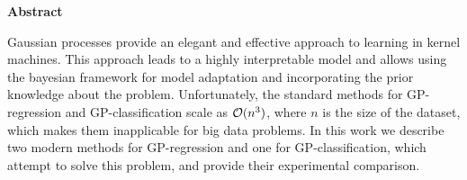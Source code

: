 \centerline{\bf Abstract}

Gaussian processes provide an elegant and effective approach to learning in kernel machines. This approach leads to a highly interpretable model and allows using the bayesian framework for model adaptation and incorporating the prior knowledge about the problem. Unfortunately, the standard methods for GP-regression and GP-classification scale as $\mathcal{O}(n^3)$, where $n$ is the size of the dataset, which makes them inapplicable for big data problems. In this work we describe two modern methods for GP-regression and one for GP-classification, which attempt to solve this problem, and provide their experimental comparison.